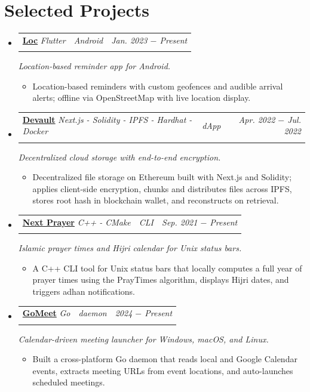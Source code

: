 \documentclass[letterpaper, 11pt]{article}
\makeatletter
\newcommand{\project}[7] {
	\vspace{-1pt}\item[]
  \begin{tabular*}{1\textwidth}[t]{ll@{\extracolsep{\fill}}r}
    #1 \href{#4}{\textbf{\color{RoyalBlue}#2}}
    \textbar{} \textit{\small#5} \textbar{ } & \textit{\footnotesize#7} & \textit{\small #3} \\
    \vspace{-8pt}
  \end{tabular*}
  \textit{\small #6}
  \vspace{-8pt}
}
\newcommand{\subproject}[1] {
\item\small
  {#1}
  \vspace{-2pt}
}
\makeatother
\begin{document}
\section{Selected Projects}
\begin{itemize}[leftmargin=0pt]
  \project
  {\faIcon{bell}}
  {Loc}{Jan. 2023 $-$ Present}
  {https://github.com/AbdeltwabMF/loc/releases/latest}{Flutter}
  {Location-based reminder app for Android.}{Android}

  \begin{itemize}
    \subproject
    {Location-based reminders with custom geofences and audible arrival alerts; offline via OpenStreetMap with live location display.}
  \end{itemize}\vspace{-4pt}

  \project
  {\faIcon{cloud}}
  {Devault}{Apr. 2022 $-$ Jul. 2022}
  {https://devault.vercel.app/}{Next.js - Solidity - IPFS - Hardhat - Docker}
  {Decentralized cloud storage with end-to-end encryption.}{dApp}

  \begin{itemize}
    \subproject
    {Decentralized file storage on Ethereum built with Next.js and Solidity; applies client-side encryption, chunks and distributes files across IPFS, stores root hash in blockchain wallet, and reconstructs on retrieval.}
  \end{itemize}\vspace{-4pt}

  \project
  {\faIcon{mosque}}
  {Next Prayer}{Sep. 2021 $-$ Present}
  {https://github.com/AbdeltwabMF/next-prayer}{C++ - CMake}
  {Islamic prayer times and Hijri calendar for Unix status bars.}{CLI}

  \begin{itemize}
    \subproject
    {A C++ CLI tool for Unix status bars that locally computes a full year of prayer times using the PrayTimes algorithm, displays Hijri dates, and triggers adhan notifications.}
  \end{itemize}\vspace{-4pt}

  \project
  {\faIcon{calendar-alt}}
  {GoMeet}{2024 $-$ Present}
  {https://github.com/AbdeltwabMF/gomeet}{Go}
  {Calendar-driven meeting launcher for Windows, macOS, and Linux.}{daemon}

  \begin{itemize}
    \subproject
    {Built a cross-platform Go daemon that reads local and Google Calendar events, extracts meeting URLs from event locations, and auto-launches scheduled meetings.}
  \end{itemize}\vspace{-4pt}
\end{itemize}
\end{document}

